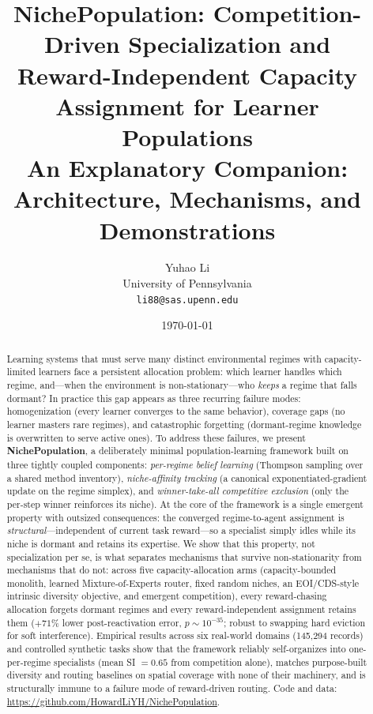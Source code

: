 \documentclass[11pt]{article}
\title{\textbf{NichePopulation: Competition-Driven Specialization and\\
Reward-Independent Capacity Assignment for Learner Populations}\\[0.4cm]
\large An Explanatory Companion: Architecture, Mechanisms, and Demonstrations}
\author{Yuhao Li\\
University of Pennsylvania\\
\texttt{li88@sas.upenn.edu}}
\date{\today}
\begin{document}
\maketitle

\begin{abstract}
Learning systems that must serve many distinct environmental regimes with
capacity-limited learners face a persistent allocation problem: which learner
handles which regime, and---when the environment is non-stationary---who
\emph{keeps} a regime that falls dormant? In practice this gap appears as three
recurring failure modes: homogenization (every learner converges to the same
behavior), coverage gaps (no learner masters rare regimes), and catastrophic
forgetting (dormant-regime knowledge is overwritten to serve active ones). To
address these failures, we present \textbf{NichePopulation}, a deliberately
minimal population-learning framework built on three tightly coupled components:
\emph{per-regime belief learning} (Thompson sampling over a shared method
inventory), \emph{niche-affinity tracking} (a canonical exponentiated-gradient
update on the regime simplex), and \emph{winner-take-all competitive exclusion}
(only the per-step winner reinforces its niche). At the core of the framework is
a single emergent property with outsized consequences: the converged
regime-to-agent assignment is \emph{structural}---independent of current task
reward---so a specialist simply idles while its niche is dormant and retains its
expertise. We show that this property, not specialization per se, is what
separates mechanisms that survive non-stationarity from mechanisms that do not:
across five capacity-allocation arms (capacity-bounded monolith, learned
Mixture-of-Experts router, fixed random niches, an EOI/CDS-style intrinsic
diversity objective, and emergent competition), every reward-chasing allocation
forgets dormant regimes and every reward-independent assignment retains them
($+71\%$ lower post-reactivation error, $p\sim10^{-35}$; robust to swapping
hard eviction for soft interference). Empirical results across six real-world
domains (145{,}294 records) and controlled synthetic tasks show that the
framework reliably self-organizes into one-per-regime specialists (mean SI
$=0.65$ from competition alone), matches purpose-built diversity and routing
baselines on spatial coverage with none of their machinery, and is structurally
immune to a failure mode of reward-driven routing. Code and data:
\url{https://github.com/HowardLiYH/NichePopulation}.
\end{abstract}
\end{document}
